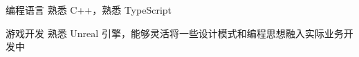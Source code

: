 

\begin{cvskills}

  \cvskill
    {编程语言} %
    {熟悉 C++，熟悉 TypeScript} %

  \cvskill
    {游戏开发} %
    {熟悉 Unreal 引擎，能够灵活将一些设计模式和编程思想融入实际业务开发中} %

\end{cvskills}
